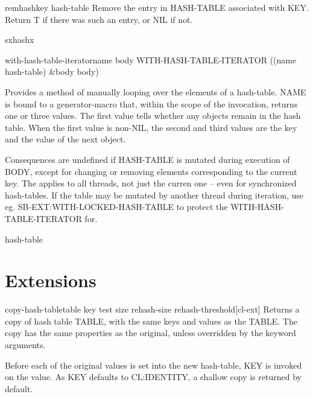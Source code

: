 \begin{function}{remhash}{key hash-table}
  Remove the entry in HASH-TABLE associated with KEY. Return T if
there was such an entry, or NIL if not.
\end{function}

\begin{function}{sxhash}{x}
  
\end{function}

\begin{macro}{with-hash-table-iterator}{name \body body}
  WITH-HASH-TABLE-ITERATOR ((name hash-table) \&body body)

Provides a method of manually looping over the elements of a hash-table. NAME
is bound to a generator-macro that, within the scope of the invocation,
returns one or three values. The first value tells whether any objects remain
in the hash table. When the first value is non-NIL, the second and third
values are the key and the value of the next object.

Consequences are undefined if HASH-TABLE is mutated during execution of BODY,
except for changing or removing elements corresponding to the current key. The
applies to all threads, not just the curren one -- even for synchronized
hash-tables. If the table may be mutated by another thread during iteration,
use eg. SB-EXT:WITH-LOCKED-HASH-TABLE to protect the WITH-HASH-TABLE-ITERATOR
for.
\end{macro}

\begin{class}{hash-table}{}
  
\end{class}

\section{Extensions}
\label{sec:extensions}

\begin{function}{copy-hash-table}{table \key key test size rehash-size rehash-threshold}[cl-ext]
  Returns a copy of hash table TABLE, with the same keys and values
as the TABLE. The copy has the same properties as the original, unless
overridden by the keyword arguments.

Before each of the original values is set into the new hash-table, KEY
is invoked on the value. As KEY defaults to CL:IDENTITY, a shallow
copy is returned by default.
\end{function}

